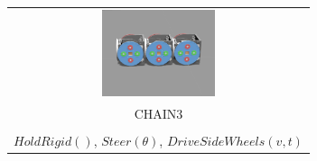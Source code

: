 \documentclass{standalone}
\newcommand{\picHeight}{1in}
\begin{document}
        \begin{tabular}{| c |}
            \hline
            \includegraphics[height=\picHeight]{body3.png} %
             \\ 
            CHAIN3
            \\ \hline
            \pbox{20cm}{\(Drive(v,t)\), \(TiltMiddleUp()\), \(Step()\), \\ \(HoldRigid()\), \(Steer(\theta)\), \(DriveSideWheels(v,t)\) }
            \\ \hline
        \end{tabular}
\end{document}
